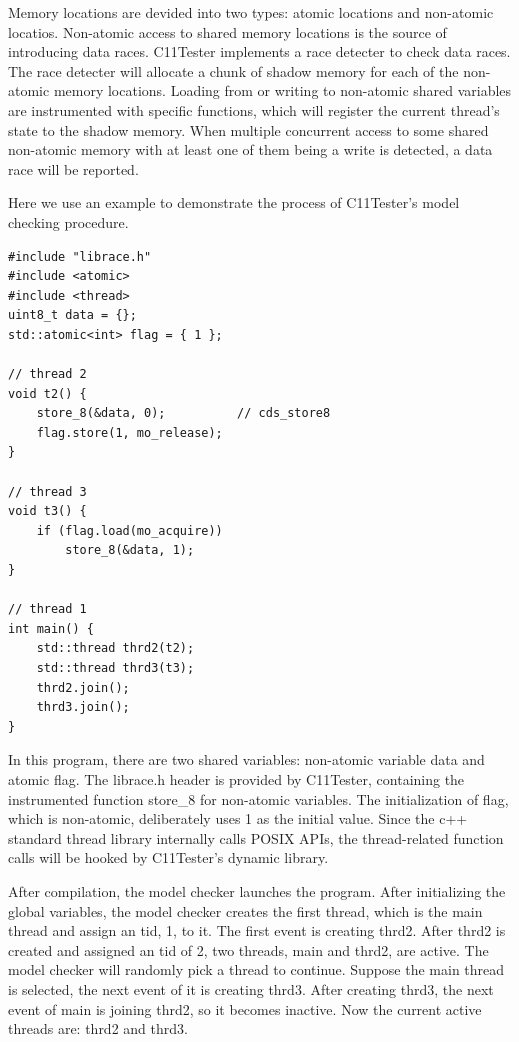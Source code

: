 Memory locations are devided into two types: atomic locations and non-atomic locatios. Non-atomic access to shared memory locations is the source of introducing data races. C11Tester implements a race detecter to check data races. The race detecter will allocate a chunk of shadow memory for each of the non-atomic memory locations. Loading from or writing to non-atomic shared variables are instrumented with specific functions, which will register the current thread's state to the shadow memory. When multiple concurrent access to some shared non-atomic memory with at least one of them being a write is detected, a data race will be reported. 

Here we use an example to demonstrate the process of C11Tester's model checking procedure. 

\begin{lstlisting}[caption={P3}, label={P3}]
#include "librace.h"
#include <atomic>
#include <thread>
uint8_t data = {};
std::atomic<int> flag = { 1 };  

// thread 2
void t2() {
    store_8(&data, 0);          // cds_store8    
    flag.store(1, mo_release); 
}

// thread 3
void t3() {
    if (flag.load(mo_acquire))
        store_8(&data, 1);
}

// thread 1
int main() {
    std::thread thrd2(t2);
    std::thread thrd3(t3);
    thrd2.join();
    thrd3.join();
}
\end{lstlisting}

In this program, there are two shared variables: non-atomic variable data and atomic flag. The librace.h header is provided by C11Tester, containing the instrumented function store\_8 for non-atomic variables. The initialization of flag, which is non-atomic, deliberately uses 1 as the initial value. Since the c++ standard thread library internally calls POSIX APIs, the thread-related function calls will be hooked by C11Tester's dynamic library. 

After compilation, the model checker launches the program. After initializing the global variables, the model checker creates the first thread, which is the main thread and assign an tid, 1, to it. The first event is creating thrd2. After thrd2 is created and assigned an tid of 2, two threads, main and thrd2, are active. The model checker will randomly pick a thread to continue. Suppose the main thread is selected, the next event of it is creating thrd3. After creating thrd3, the next event of main is joining thrd2, so it becomes inactive. Now the current active threads are: thrd2 and thrd3. 

